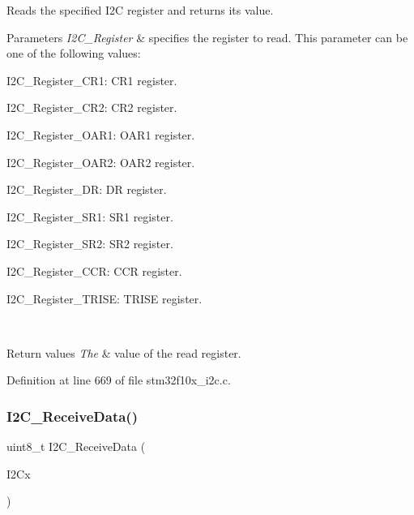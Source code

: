 Reads the specified I2C register and returns its value. 


\begin{DoxyParams}{Parameters}
{\em I2\+C\+\_\+\+Register} & specifies the register to read. This parameter can be one of the following values\+: \begin{DoxyItemize}
\item I2\+C\+\_\+\+Register\+\_\+\+C\+R1\+: C\+R1 register. \item I2\+C\+\_\+\+Register\+\_\+\+C\+R2\+: C\+R2 register. \item I2\+C\+\_\+\+Register\+\_\+\+O\+A\+R1\+: O\+A\+R1 register. \item I2\+C\+\_\+\+Register\+\_\+\+O\+A\+R2\+: O\+A\+R2 register. \item I2\+C\+\_\+\+Register\+\_\+\+DR\+: DR register. \item I2\+C\+\_\+\+Register\+\_\+\+S\+R1\+: S\+R1 register. \item I2\+C\+\_\+\+Register\+\_\+\+S\+R2\+: S\+R2 register. \item I2\+C\+\_\+\+Register\+\_\+\+C\+CR\+: C\+CR register. \item I2\+C\+\_\+\+Register\+\_\+\+T\+R\+I\+SE\+: T\+R\+I\+SE register. \end{DoxyItemize}
\\
\hline
\end{DoxyParams}

\begin{DoxyRetVals}{Return values}
{\em The} & value of the read register. \\
\hline
\end{DoxyRetVals}


Definition at line 669 of file stm32f10x\+\_\+i2c.\+c.

\mbox{\label{group___i2_c___exported___functions_gaeaaa4b6f77f50eb57465148c55d27fb2}} 
\subsubsection{\texorpdfstring{I2\+C\+\_\+\+Receive\+Data()}{I2C\_ReceiveData()}}
{\footnotesize\ttfamily uint8\+\_\+t I2\+C\+\_\+\+Receive\+Data (\begin{DoxyParamCaption}\item[{\hyperlink{struct_i2_c___type_def}{I2\+C\+\_\+\+Type\+Def} $\ast$}]{I2\+Cx }\end{DoxyParamCaption})}



